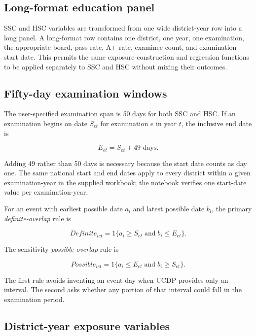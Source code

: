 \documentclass[11pt]{article}
\begin{document}
\subsection{Long-format education panel}

SSC and HSC variables are transformed from one wide district-year row into a long panel. A long-format row contains one district, one year, one examination, the appropriate board, pass rate, A+ rate, examinee count, and examination start date. This permits the same exposure-construction and regression functions to be applied separately to SSC and HSC without mixing their outcomes.

\subsection{Fifty-day examination windows}

The user-specified examination span is 50 days for both SSC and HSC. If an examination begins on date $S_{et}$ for examination $e$ in year $t$, the inclusive end date is

\begin{equation}
E_{et}=S_{et}+49\text{ days}.
\end{equation}

Adding 49 rather than 50 days is necessary because the start date counts as day one. The same national start and end dates apply to every district within a given examination-year in the supplied workbook; the notebook verifies one start-date value per examination-year.

For an event with earliest possible date $a_i$ and latest possible date $b_i$, the primary \emph{definite-overlap} rule is

\begin{equation}
Definite_{iet}=1\{a_i \geq S_{et}\;\text{and}\;b_i \leq E_{et}\}.
\end{equation}

The sensitivity \emph{possible-overlap} rule is

\begin{equation}
Possible_{iet}=1\{a_i \leq E_{et}\;\text{and}\;b_i \geq S_{et}\}.
\end{equation}

The first rule avoids inventing an event day when UCDP provides only an interval. The second asks whether any portion of that interval could fall in the examination period.

\subsection{District-year exposure variables}
\end{document}

